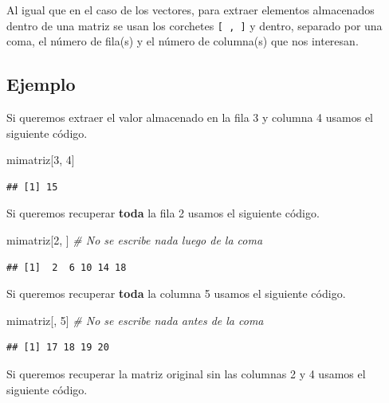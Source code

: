 \documentclass[10pt,]{krantz}
\makeatletter
\newenvironment{Shaded}{\begin{snugshade}}{\end{snugshade}}
\newcommand{\DecValTok}[1]{\textcolor[rgb]{0.00,0.00,0.81}{#1}}
\newcommand{\CommentTok}[1]{\textcolor[rgb]{0.56,0.35,0.01}{\textit{#1}}}
\newcommand{\NormalTok}[1]{#1}
\newenvironment{kframe}{%
\medskip{}
\setlength{\fboxsep}{.8em}
 \def\at@end@of@kframe{}%
 \ifinner\ifhmode%
  \def\at@end@of@kframe{\end{minipage}}%
  \begin{minipage}{\columnwidth}%
 \fi\fi%
 \def\FrameCommand##1{\hskip\@totalleftmargin \hskip-\fboxsep
 \colorbox{shadecolor}{##1}\hskip-\fboxsep
     \hskip-\linewidth \hskip-\@totalleftmargin \hskip\columnwidth}%
 \MakeFramed {\advance\hsize-\width
   \@totalleftmargin\z@ \linewidth\hsize
   \@setminipage}}%
 {\par\unskip\endMakeFramed%
 \at@end@of@kframe}
\renewenvironment{Shaded}{\begin{kframe}}{\end{kframe}}
\makeatother
\begin{document}
Al igual que en el caso de los vectores, para extraer elementos
almacenados dentro de una matriz se usan los corchetes
\texttt{{[}\ ,\ {]}} y dentro, separado por una coma, el número de
fila(s) y el número de columna(s) que nos interesan.

\subsection*{Ejemplo}\label{ejemplo-1}


Si queremos extraer el valor almacenado en la fila 3 y columna 4 usamos
el siguiente código.

\begin{Shaded}
\begin{Highlighting}[]
\NormalTok{mimatriz[}\DecValTok{3}\NormalTok{, }\DecValTok{4}\NormalTok{]}
\end{Highlighting}
\end{Shaded}

\begin{verbatim}
## [1] 15
\end{verbatim}

Si queremos recuperar \textbf{toda} la fila 2 usamos el siguiente
código.

\begin{Shaded}
\begin{Highlighting}[]
\NormalTok{mimatriz[}\DecValTok{2}\NormalTok{, ]  }\CommentTok{# No se escribe nada luego de la coma}
\end{Highlighting}
\end{Shaded}

\begin{verbatim}
## [1]  2  6 10 14 18
\end{verbatim}

Si queremos recuperar \textbf{toda} la columna 5 usamos el siguiente
código.

\begin{Shaded}
\begin{Highlighting}[]
\NormalTok{mimatriz[, }\DecValTok{5}\NormalTok{]  }\CommentTok{# No se escribe nada antes de la coma}
\end{Highlighting}
\end{Shaded}

\begin{verbatim}
## [1] 17 18 19 20
\end{verbatim}

Si queremos recuperar la matriz original sin las columnas 2 y 4 usamos
el siguiente código.
\end{document}
